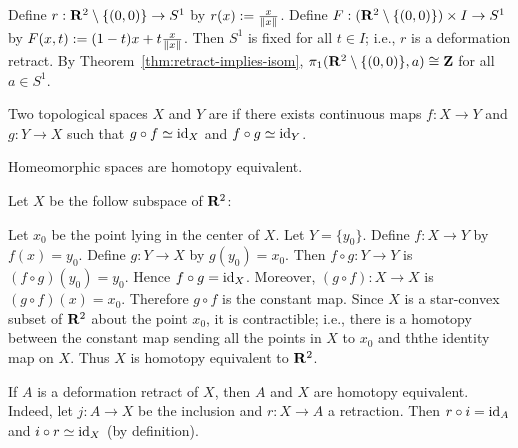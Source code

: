 \begin{example}
    Define $r:\mathbf{R}^2 \setminus \{(0,0)\} \rightarrow S^1$ by $r(x) := \frac{x}{\left\lVert x \right\rVert}$. Define $F:(\mathbf{R}^2 \setminus \{(0,0)\}) \times I \rightarrow S^1$ by $F(x,t):=(1-t)x + t \frac{x}{\left\lVert x \right\rVert}$. Then $S^1$ is fixed for all $t \in I$; i.e., $r$ is a deformation retract. By Theorem~\ref{thm:retract-implies-isom}, $\pi_1(\mathbf{R}^2 \setminus\{(0,0)\},a) \cong \mathbf{Z}$ for all $a \in S^1$.
\end{example}

\begin{definition}
    Two topological spaces $X$ and $Y$ are  if there exists continuous maps $f:X \rightarrow Y$ and $g:Y \rightarrow X$ such that $g \circ f \simeq \operatorname{id}_X$ and $f \circ g \simeq \operatorname{id}_Y$. 
\end{definition}

\begin{example}
    Homeomorphic spaces are homotopy equivalent.
\end{example}

\begin{example}
    Let $X$ be the follow subspace of $\mathbf{R}^2$:
    \begin{center}
    \end{center}
    Let $x_0$ be the point lying in the center of $X$. Let $Y = \{y_0\}$. Define $f:X \rightarrow Y$ by $f(x) = y_0$. Define $g:Y \rightarrow X$ by  $g(y_0) = x_0$. Then $f \circ g:Y \rightarrow Y$ is  $(f \circ g)(y_0) = y_0$. Hence $f \circ g = \operatorname{id}_X$. Moreover,  $(g \circ f):X \rightarrow X$ is  $(g \circ f)(x) = x_0$. Therefore $g \circ f$ is the constant map. Since  $X$ is a star-convex subset of $\mathbf{R}^2$ about the point  $x_0$, it is contractible; i.e., there is a homotopy between the constant map sending all the points in $X$ to  $x_0$ and ththe identity map on $X$. Thus  $X$ is homotopy equivalent to  $\mathbf{R}^2$.
\end{example}

\begin{example}
	If $A$ is a deformation retract of $X$, then $A$ and  $X$ are homotopy equivalent. Indeed, let  $j:A \rightarrow X$ be the inclusion and  $r:X \rightarrow A$ a retraction. Then  $r \circ i = \operatorname{id}_A$ and  $i \circ r \simeq \operatorname{id}_X$ (by definition).
\end{example}

